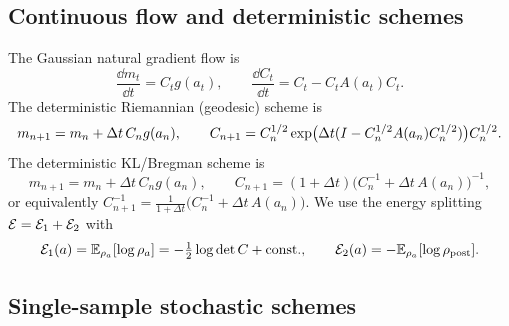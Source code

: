 \subsection{Continuous flow and deterministic schemes}

The Gaussian natural gradient flow is
\begin{equation}
\label{eq:NG-flow}
    \frac{\dd m_t}{\dd t}
    =
    C_tg(a_t),
    \qquad
    \frac{\dd C_t}{\dd t}
    =
    C_t-C_tA(a_t)C_t.
\end{equation}
The deterministic Riemannian (geodesic) scheme is
\begin{equation}
\label{eq:Riem-det}
    m_{n+1}=m_n+\Delta t\,C_ng(a_n),
    \qquad
    C_{n+1}
    =
    C_n^{1/2}
    \exp\bigl(\Delta t(I-C_n^{1/2}A(a_n)C_n^{1/2})\bigr)
    C_n^{1/2}.
\end{equation}
The deterministic KL/Bregman scheme is
\begin{equation}
\label{eq:KL-det}
    m_{n+1}=m_n+\Delta t\,C_ng(a_n),
    \qquad
    C_{n+1}
    =(1+\Delta t)\bigl(C_n^{-1}+\Delta t\,A(a_n)\bigr)^{-1},
\end{equation}
or equivalently $C_{n+1}^{-1}=\tfrac1{1+\Delta t}\bigl(C_n^{-1}+\Delta t\,A(a_n)\bigr)$.
We use the energy splitting $\mathcal{E}=\mathcal{E}_1+\mathcal{E}_2$ with
\[
    \mathcal{E}_1(a)=\mathbb{E}_{\rho_a}[\log\rho_a]=-\tfrac12\log\det C+\text{const.},
    \qquad
    \mathcal{E}_2(a)=-\mathbb{E}_{\rho_a}[\log\rho_{\mathrm{post}}].
\]

\subsection{Single-sample stochastic schemes}

